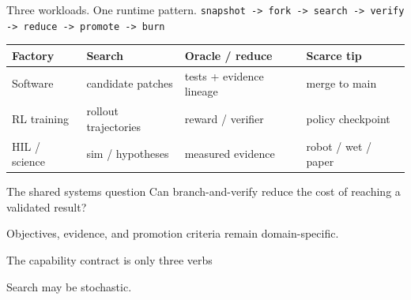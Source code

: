 \begin{frame}{Three workloads. One runtime pattern.}
\centering
\large
\texttt{snapshot -> fork -> search -> verify -> reduce -> promote -> burn}

\vspace{0.8em}
\normalsize
\begin{tabular}{p{}p{}p{}p{}}
\toprule
\textbf{Factory} & \textbf{Search} & \textbf{Oracle / reduce} & \textbf{Scarce tip} \\
\midrule
Software & candidate patches & tests + evidence lineage & merge to main \\
RL training & rollout trajectories & reward / verifier & policy checkpoint \\
HIL / science & sim / hypotheses & measured evidence & robot / wet / paper \\
\bottomrule
\end{tabular}

\vspace{0.8em}
\begin{block}{The shared systems question}
\centering\small Can branch-and-verify reduce the cost of reaching a validated result?\par Objectives, evidence, and promotion criteria remain domain-specific.
\end{block}
\end{frame}

\begin{frame}{The capability contract is only three verbs}
\centering
{}

\vspace{1em}
\begin{center}
\large \law
\end{center}

\vspace{0.45em}
\Large Search may be stochastic. 
\end{frame}
